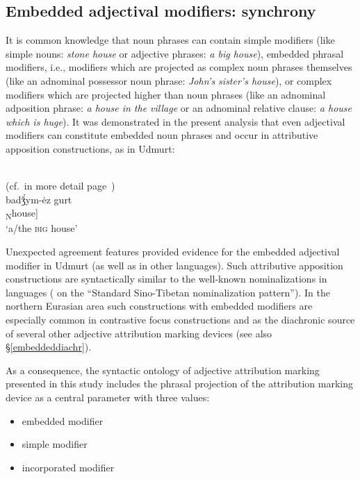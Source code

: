 \subsection{Embedded adjectival modifiers: synchrony}
\label{embeddedsynchr}
It is common knowledge that noun phrases can contain simple modifiers (like simple nouns: \textit{stone house} or adjective phrases: \textit{a big house}), embedded phrasal modifiers, i.e., modifiers which are projected as complex noun phrases themselves (like an adnominal possessor noun phrase: \textit{John's sister's house}), or complex modifiers which are projected higher than noun phrases (like an adnominal adposition phrase: \textit{a house in the village} or an adnominal relative clause: \textit{a house which is huge}). It was demonstrated in the present analysis that even adjectival modifiers can constitute embedded noun phrases and occur in attributive apposition constructions, as in Udmurt:
\begin{exe}
\\{\rm (cf.~in more detail page~\pageref{udmurt synchr})}\\
\gll	{}		{}		badǯ́ym-ėz gurt\\
	[\textsubscript{NP} 	[\textsubscript{NP'} \textsubscript{A}big-\textsc{nmlz}] \textsubscript{N}house]\\
\glt	‘a/the \textsc{big} house’
\end{exe}

Unexpected agreement features provided evidence for the embedded adjectival modifier in Udmurt (as well as in other languages). Such attributive apposition constructions are syntactically similar to the well-known nominalizations in  languages (\citealt[cf.][]{bickel1999} on the “Standard Sino-Tibetan nominalization pattern”). In the northern Eurasian area such constructions with embedded modifiers are especially  common in contrastive focus constructions and as the diachronic source of several other adjective attribution marking devices (see also \S\ref{embeddeddiachr}). 

As a consequence, the syntactic ontology of adjective attribution marking presented in this study includes the phrasal projection of the attribution marking device as a central parameter with three values:
\begin{itemize}
\item embedded modifier
\item simple modifier
\item incorporated modifier
\end{itemize}

